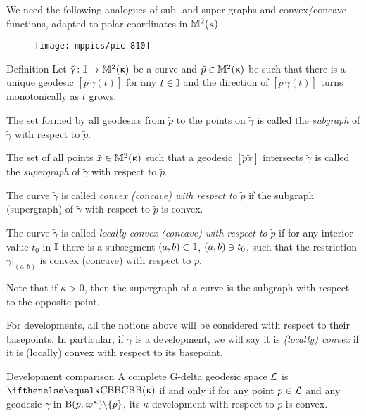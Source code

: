 We need the following analogues of sub- and super-graphs %
 and convex/concave functions, adapted to polar coordinates in $\mathbb{M}_{{}}^{2}({\upkappa})$.

\begin{wrapfigure}{o}{38 mm}
\vskip-0mm
\centering
\texttt{[image: mppics/pic-810]}
\end{wrapfigure}

\begin{thm}{Definition}\label{def:convex-devel}
Let $\tilde \gamma\:\II\to\Lob2\kappa$ be a curve and $\tilde p\in\Lob2\kappa$ be such that there is a unique geodesic $[\tilde p\,\tilde \gamma(t)]$ for any $t\in\II$ and the direction of $[\tilde p\,\tilde \gamma(t)]$ turns monotonically as $t$ grows.

The set formed by all geodesics from  $\tilde p$ to the points on $\tilde \gamma$ is called the \emph{subgraph} of $\tilde \gamma$ with respect to $\tilde p$.

The set of all points $\tilde x\in\Lob2{\kappa}$ such that a geodesic $[\tilde p\tilde x]$ intersects $\tilde \gamma$ is called the \emph{supergraph} of $\tilde \gamma$ with respect to $\tilde p$.

The curve $\tilde \gamma$ is called \emph{convex (concave) with respect to} $\tilde p$ if the subgraph (supergraph) of $\tilde \gamma$ with respect to $\tilde p$ is convex.

The curve $\tilde \gamma$ is called 
\emph{locally convex (concave) with respect to} $\tilde p$ 
if for any interior value $t_0$ in $\mathbb{I}$ there is a subsegment $(a,b)\subset\II$, $(a,b)\z\ni t_0$, such that the restriction $\tilde \gamma|_{(a,b)}$ is convex (concave) with respect to $\tilde p$.
\end{thm}

Note that if $\kappa>0$, then the supergraph of a curve is the subgraph with respect to the opposite point. 

For developments,
all the notions above will be considered with respect to their basepoints.
In particular, if $\tilde \gamma$ is a development, we will say it is \emph{(locally) convex} if it is (locally) convex with respect to its basepoint.


{\sloppy 

\begin{thm}{Development comparison}\label{thm:devel} 
A complete G-delta geodesic space
$\mathcal{L}$ is $\Alex\kappa$ if and only if for any point $p\in \spc{L}$ and any geodesic $\gamma$ in $\oBall(p,\varpi\kappa)\backslash\{p\}$, 
its $\kappa$-development with respect to $p$ is convex.
\end{thm}

}



